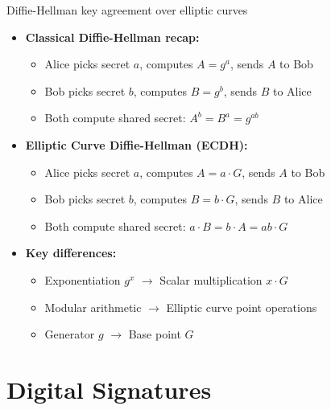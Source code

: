 \documentclass[aspectratio=169, lualatex, handout]{beamer}
\begin{document}
\begin{frame}{Diffie-Hellman key agreement over elliptic curves}
	\begin{itemize}
		\item \textbf{Classical Diffie-Hellman recap:}
		      \begin{itemize}
			      \item Alice picks secret $a$, computes $A = g^a$, sends $A$ to Bob
			      \item Bob picks secret $b$, computes $B = g^b$, sends $B$ to Alice
			      \item Both compute shared secret: $A^b = B^a = g^{ab}$
		      \end{itemize}
		\item \textbf{Elliptic Curve Diffie-Hellman (ECDH):}
		      \begin{itemize}
			      \item Alice picks secret $a$, computes $A = a \cdot G$, sends $A$ to Bob
			      \item Bob picks secret $b$, computes $B = b \cdot G$, sends $B$ to Alice
			      \item Both compute shared secret: $a \cdot B = b \cdot A = ab \cdot G$
		      \end{itemize}
		\item \textbf{Key differences:}
		      \begin{itemize}
			      \item Exponentiation $g^x$ $\rightarrow$ Scalar multiplication $x \cdot G$
			      \item Modular arithmetic $\rightarrow$ Elliptic curve point operations
			      \item Generator $g$ $\rightarrow$ Base point $G$
		      \end{itemize}
	\end{itemize}
\end{frame}

\section{Digital Signatures}
\end{document}
